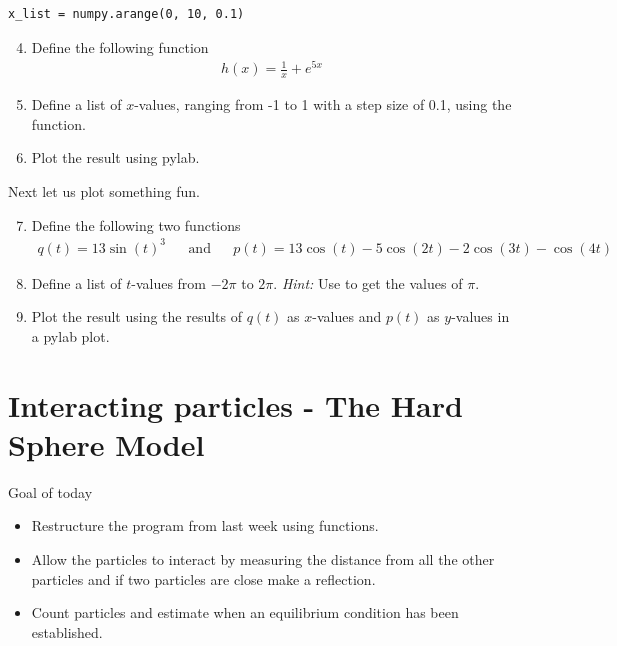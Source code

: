 \documentclass{article}
\begin{document}
\begin{lstlisting}
x_list = numpy.arange(0, 10, 0.1)
\end{lstlisting}

\begin{enumerate}
  \setcounter{enumi}{3}
  \item Define the following function
    \begin{align}
        h(x) = \frac{1}{x} + e^{5x}
    \end{align}

  \item Define a list of $x$-values, ranging from -1 to 1 with a step size of 0.1, using the  function.

  \item Plot the result using pylab.

\end{enumerate}

Next let us plot something fun.

\begin{enumerate}
  \setcounter{enumi}{6}
  \item Define the following two functions
    \begin{align}
        q(t) = 13\sin(t)^3 && \text{and} && p(t) = 13\cos(t) - 5 \cos(2t) - 2 \cos(3t) - \cos(4t)
    \end{align}

  \item Define a list of $t$-values from $-2\pi$ to $2\pi$.
      {\em Hint:} Use  to get the values of $\pi$.

  \item Plot the result using the results of $q(t)$ as $x$-values and $p(t)$ as
      $y$-values in a pylab plot.

\end{enumerate}

\newpage
\section{Interacting particles - The Hard Sphere Model}

Goal of today

\begin{itemize}
  \item Restructure the program from last week using functions.
  \item Allow the particles to interact by measuring the distance from all the other particles
    and if two particles are close make a reflection.
  \item Count particles and estimate when an equilibrium condition has been established.
\end{itemize}
\end{document}
